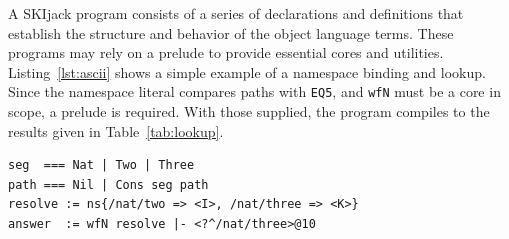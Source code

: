 \documentclass[english,submission,code=tt]{programming}
\begin{document}
A SKIjack program consists of a series of declarations and definitions 
that establish the structure and behavior of the object language 
terms.  These programs may rely on a prelude to provide essential cores 
and utilities.  Listing~\ref{lst:ascii} shows a simple example of
a namespace binding and lookup.  Since the namespace literal compares 
paths with \texttt{EQ5}, and \texttt{wfN} must be a core in scope, a 
prelude is required.  With those supplied, the program compiles to the 
results given in Table~\ref{tab:lookup}.



\begin{lstlisting}[label=lst:ascii,
                   caption={A simple example of SKIjack code.  This
                            program demonstrates a simple lookup.}]
seg  === Nat | Two | Three
path === Nil | Cons seg path
resolve := ns{/nat/two => <I>, /nat/three => <K>}
answer  := wfN resolve |- <?^/nat/three>@10
\end{lstlisting}
\end{document}
